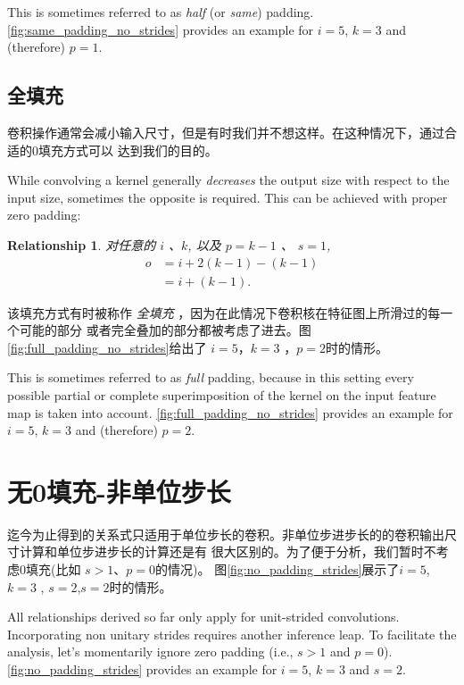\documentclass[notitlepage]{report}
\newtheorem{relationship}{Relationship}
\begin{document}
\noindent This is sometimes referred to as {\em half\/} (or {\em same\/})
padding. \autoref{fig:same_padding_no_strides} provides an example for
$i = 5$, $k = 3$ and (therefore) $p = 1$.

\subsection{全填充}

卷积操作通常会减小输入尺寸，但是有时我们并不想这样。在这种情况下，通过合适的0填充方式可以
达到我们的目的。

While convolving a kernel generally {\em decreases\/} the output size with
respect to the input size, sometimes the opposite is required. This can be
achieved with proper zero padding:

\begin{relationship}\label{rel:full_padding_no_strides}
对任意的 $i$ 、$k$, 以及 $p = k - 1$ 、 $s = 1$,
\begin{equation*}
\begin{split}
    o &= i + 2(k - 1) - (k - 1) \\
      &= i + (k - 1).
\end{split}
\end{equation*}
\end{relationship}

\noindent 该填充方式有时被称作 {\em 全填充\/} ，因为在此情况下卷积核在特征图上所滑过的每一个可能的部分
或者完全叠加的部分都被考虑了进去。图\autoref{fig:full_padding_no_strides}给出了
$i = 5$，$k = 3$ ，$p = 2$时的情形。

\noindent This is sometimes referred to as {\em full\/} padding, because in this
setting every possible partial or complete superimposition of the kernel on the
input feature map is taken into account. \autoref{fig:full_padding_no_strides}
provides an example for $i = 5$, $k = 3$ and (therefore) $p = 2$.

\section{无0填充-非单位步长}

迄今为止得到的关系式只适用于单位步长的卷积。非单位步进步长的的卷积输出尺寸计算和单位步进步长的计算还是有
很大区别的。为了便于分析，我们暂时不考虑0填充(比如 $s > 1$、$p = 0$的情况)。 
图\autoref{fig:no_padding_strides}展示了$i =5$, $k = 3$ , $s = 2$,$s = 2$时的情形。

All relationships derived so far only apply for unit-strided convolutions.
Incorporating non unitary strides requires another inference leap. To
facilitate the analysis, let's momentarily ignore zero padding (i.e., $s > 1$
and $p = 0$). \autoref{fig:no_padding_strides} provides an example for $i =
5$, $k = 3$ and $s = 2$.
\end{document}
